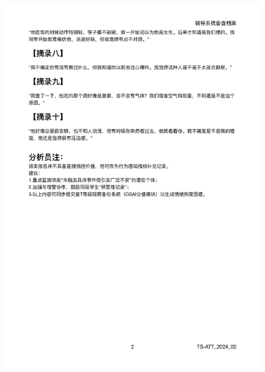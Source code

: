 \documentclass[]{ctexrep}
\begin{document}
	\includegraphics[scale=0.6]{./附件2正文_页面_2.png}
	
\end{document}
